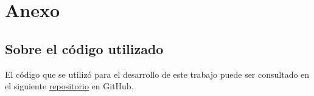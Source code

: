 
\chapter{Anexo}

\section{Sobre el código utilizado}

El código que se utilizó para el desarrollo de este trabajo puede ser consultado en el siguiente \href{https://github.com/DanielCuaxiloa/Tesis}{repositorio} en GitHub.